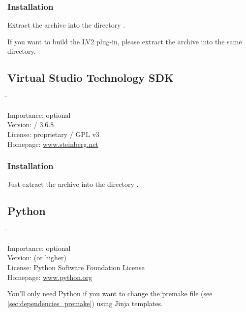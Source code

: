 \subsubsection{Installation}

Extract the archive into the directory .

If you want to build the LV2 plug-in, please extract the archive
 into the same directory.

\subsection{Virtual Studio Technology SDK}

\begin{tabbing}
  \hspace*{6em}\=\=\kill

  Importance:  \> optional \\
  Version:      / 3.6.8 \\
  License:     \> proprietary / GPL v3 \\
  Homepage:    \> \href{http://www.steinberg.net/en/company/developer.html}{www.steinberg.net}
\end{tabbing}

\subsubsection{Installation}

Just extract the archive into the directory .

\subsection{Python}

\begin{tabbing}
  \hspace*{6em}\=\=\kill

  Importance:  \> optional \\
  Version:      (or higher) \\
  License:     \> Python Software Foundation License \\
  Homepage:    \> \href{http://www.python.org/}{www.python.org}
\end{tabbing}

You'll only need Python if you want to change the premake file (see
\ref{sec:dependencies_premake}) using Jinja templates.

